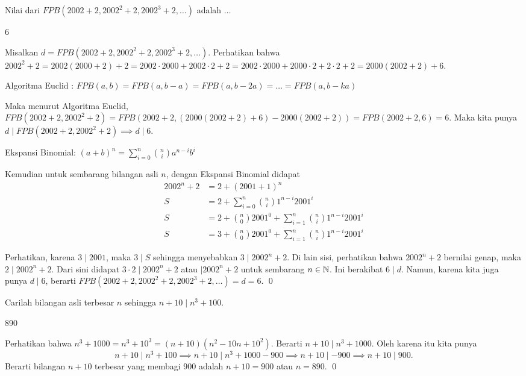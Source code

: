 \documentclass[12pt]{scrartcl}
\begin{document}
	\begin{soaljawab}
		Nilai dari $FPB(2002+2,2002^2+2,2002^3+2,\dots)$ adalah $\dots$
		
		\begin{jawaban}
		  	6
		\end{jawaban}
		\begin{solusi}
		Misalkan $d=FPB(2002+2,2002^2+2,2002^3+2,\dots)$. Perhatikan bahwa $2002^2+2=2002(2000+2)+2=2002\cdot 2000+2002\cdot 2+2=2002\cdot 2000+2000\cdot 2 +2\cdot 2+2=2000(2002+2)+6$. 
			\begin{lemmarev}
			Algoritma Euclid : $FPB(a,b)=FPB(a,b-a)=FPB(a,b-2a)=\dots =FPB(a,b-ka)$
			\end{lemmarev}
		Maka menurut Algoritma Euclid, $FPB(2002+2,2002^2+2)=FPB(2002+2,(2000(2002+2)+6)-2000(2002+2))=FPB(2002+2,6)=6$. Maka kita punya $d \mid FPB(2002+2,2002^2+2) \implies d \mid 6$. 
		
		\begin{lemmarev}
					Ekspansi Binomial: $(a+b)^n=\sum_{i=0}^{n} {n \choose i}a^{n-i}b^i$
					\end{lemmarev}
		
		Kemudian untuk sembarang bilangan asli $n$, dengan Ekspansi Binomial didapat
		\begin{align*}
		2002^n+2 &= 2+(2001+1)^n\\
			S	&= 2 + \sum_{i=0}^{n} {n \choose i}1^{n-i}2001^i\\
			S	&= 2 + {n \choose 0}2001^0 + \sum_{i=1}^{n} {n \choose i}1^{n-i}2001^i\\
			S	&= 3 + {n \choose 0}2001^0 + \sum_{i=1}^{n} {n \choose i}1^{n-i}2001^i
		\end{align*}
			
		Perhatikan, karena $3 \mid 2001$, maka $3 \mid S$ sehingga menyebabkan $3 \mid 2002^n+2$. Di lain sisi, perhatikan bahwa $2002^n+2$ bernilai genap, maka $2 \mid 2002^n +2$. Dari sini didapat $3\cdot2 \mid 2002^n+2$ atau $\mid 2002^n+2$ untuk sembarang $n \in \mathbb N$. Ini berakibat $6 \mid d$. Namun, karena kita juga punya $d \mid 6$, berarti $FPB(2002+2,2002^2+2,2002^3+2,\dots)=d=6$. \qed
		\end{solusi}
	\end{soaljawab}
	
	\begin{soaljawab}
		Carilah bilangan asli terbesar $n$ sehingga $n+10 \mid n^3+100$.
		
		\begin{jawaban}
		890
		\end{jawaban}
		\begin{solusi}
		Perhatikan bahwa $n^3+1000=n^3+10^3=(n+10)(n^2-10n+10^2)$. Berarti $n+10 \mid n^3+1000$. Oleh karena itu kita punya $$n+10 \mid n^3+100 \implies n+10 \mid n^3+1000-900 \implies n+10 \mid -900 \implies n+10 \mid 900.$$Berarti bilangan $n+10$ terbesar yang membagi 900 adalah $n+10=900$ atau $n=890$. \qed
		\end{solusi}
	\end{soaljawab}
\end{document}

